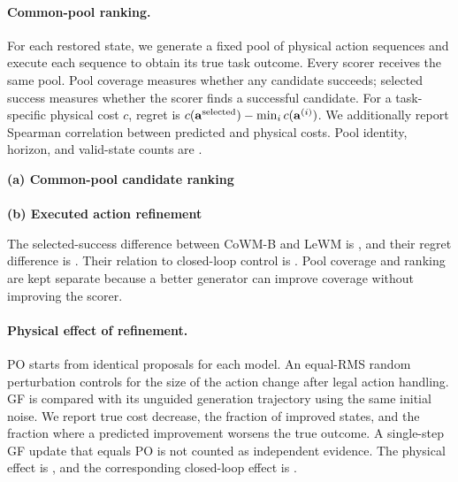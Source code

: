 \paragraph{Common-pool ranking.}
For each restored state, we generate a fixed pool of physical action sequences and execute each sequence to obtain its true task outcome. Every scorer receives the same pool. Pool coverage measures whether any candidate succeeds; selected success measures whether the scorer finds a successful candidate. For a task-specific physical cost $c$, regret is $c(\mathbf a^{\rm selected})-\min_i c(\mathbf a^{(i)})$. We additionally report Spearman correlation between predicted and physical costs. Pool identity, horizon, and valid-state counts are .
\begin{table}[t]
\centering\small
\textbf{(a) Common-pool candidate ranking}\\[3pt]
\\[7pt]
\textbf{(b) Executed action refinement}\\[3pt]
\resizebox{0.97\textwidth}{!}{}
\caption{Decision diagnostics, repeated per task. (a) Common-pool coverage is shared across scorers. The physical-cost oracle has zero regret by definition; its success can differ from a success-based oracle. (b) Real cost decrease is measured by executing original and updated actions from the same state. Misleading updates lower predicted cost but worsen physical cost. Closed-loop success is a separate evaluation.}
\label{tab:ranking_results}
\end{table}
The selected-success difference between CoWM-B and LeWM is , and their regret difference is . Their relation to closed-loop control is . Pool coverage and ranking are kept separate because a better generator can improve coverage without improving the scorer.

\paragraph{Physical effect of refinement.}
PO starts from identical proposals for each model. An equal-RMS random perturbation controls for the size of the action change after legal action handling. GF is compared with its unguided generation trajectory using the same initial noise. We report true cost decrease, the fraction of improved states, and the fraction where a predicted improvement worsens the true outcome. A single-step GF update that equals PO is not counted as independent evidence. The physical effect is , and the corresponding closed-loop effect is .

